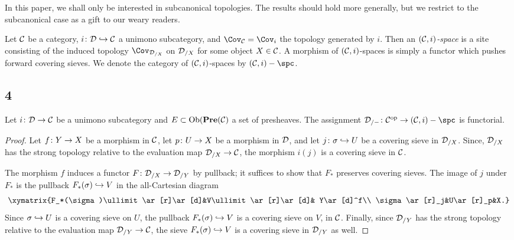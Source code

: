 \documentclass[10pt]{amsart}
\begin{document}
In this paper, we shall only be interested in subcanonical topologies.  The results should hold more generally, but we restrict to the subcanonical case as a gift to our weary readers.

\begin{definition}

Let $\mathcal{C}$ be a category, $i\colon\mathcal{D}\hookrightarrow\mathcal{C}$ a unimono subcategory, and $\Cov_\mcC=\Cov_i$ the topology generated by $i$.  Then an {\em $(\mathcal{C},i)$-space} is a site consisting of the induced topology $\Cov_{\mcD_{/X}}$ on $\mathcal{D}_{/X}$ for some object $X\in\mathcal{C}$.  A morphism of $(\mathcal{C},i)$-spaces is simply a functor which pushes forward covering sieves.  We denote the category of $(\mathcal{C},i)$-spaces by $(\mcC,i)-\spc$.

\end{definition}





\subsection{4}

\begin{lemma}

Let $i\colon\mathcal{D}\rightarrow\mathcal{C}$ be a unimono subcategory and $E\subset\textnormal{Ob}({\bf Pre}(\mathcal{C})$ a set of presheaves.  The assignment $\mcD_{/-}\taking\mcC\op\to(\mcC,i)-\spc$ is functorial.

\end{lemma}

\begin{proof}

Let $f\colon Y\rightarrow X$ be a morphism in $\mathcal{C}$, let $p\colon U\rightarrow X$ be a morphism in $\mathcal{D}$, and let $j\colon\sigma\hookrightarrow U$ be a covering sieve in $\mathcal{D}_{/X}$.  Since, $\mathcal{D}_{/X}$ has the strong topology relative to the evaluation map $\mathcal{D}_{/X}\rightarrow\mathcal{C}$, the morphism $i(j)$ is a covering sieve in $\mathcal{C}$.

The morphism $f$ induces a functor $F\colon\mathcal{D}_{/X}\rightarrow\mathcal{D}_{/Y}$ by pullback; it suffices to show that $F_*$ preserves covering sieves.  The image of $j$ under $F_*$ is the pullback $F_*(\sigma)\hookrightarrow V$ in the all-Cartesian diagram $$\xymatrix{F_*(\sigma)\ullimit\ar[r]\ar[d]&V\ullimit\ar[r]\ar[d]& Y\ar[d]^f\\ \sigma\ar[r]_j&U\ar[r]_p&X.}$$  Since $\sigma\hookrightarrow U$ is a covering sieve on $U$, the pullback $F_*(\sigma)\hookrightarrow V$ is a covering sieve on $V$, in $\mathcal{C}$.  Finally, since $\mathcal{D}_{/Y}$ has the strong topology relative to the evaluation map $\mathcal{D}_{/Y}\rightarrow\mathcal{C}$, the sieve $F_*(\sigma)\hookrightarrow V$ is a covering sieve in $\mathcal{D}_{/Y}$ as well.

\end{proof}
\end{document}
